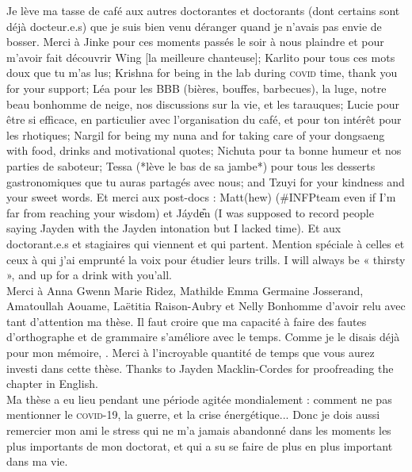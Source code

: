 Je lève ma tasse de café aux autres doctorantes et doctorants (dont certains sont déjà docteur.e.s) que je suis bien venu déranger quand je n'avais pas envie de bosser. Merci à Jinke pour ces moments passés le soir à nous plaindre et pour m'avoir fait découvrir Wing [la meilleure chanteuse]; Karlito pour tous ces mots doux que tu m'as lus; Krishna for being in the lab during \textsc{covid} time, thank you for your support; Léa pour les BBB (bières, bouffes, barbecues), la luge, notre beau bonhomme de neige, nos discussions sur la vie, et les tarauques; Lucie pour être si efficace, en particulier avec l'organisation du café, et pour ton intérêt pour les rhotiques; Nargil for being my nuna and for taking care of your dongsaeng with food, drinks and motivational quotes; Nichuta pour ta bonne humeur et nos parties de saboteur; Tessa (*lève le bas de sa jambe*) pour tous les desserts gastronomiques que tu auras partagés avec nous; and Tzuyi for your kindness and your sweet words. Et merci aux post-docs : Matt(hew) (\#INFPteam even if I'm far from reaching your wisdom) et Jáyd{\small e᷈}n (I was supposed to record people saying Jayden with the Jayden intonation but I lacked time). Et aux doctorant.e.s et stagiaires qui viennent et qui partent. Mention spéciale à celles et ceux à qui j'ai emprunté la voix pour étudier leurs trills. I will always be « thirsty », and up for a drink with you'all.\\

Merci à Anna Gwenn Marie Ridez, Mathilde Emma Germaine Josserand, Amatoullah Aouame, Laëtitia Raison-Aubry et Nelly Bonhomme d'avoir relu avec tant d'attention ma thèse. Il faut croire que ma capacité à faire des fautes d’orthographe et de grammaire s'améliore avec le temps. Comme je le disais déjà pour mon mémoire, . Merci à l'incroyable quantité de temps que vous aurez investi dans cette thèse. Thanks to Jayden Macklin-Cordes for proofreading the chapter in English.\\

Ma thèse a eu lieu pendant une période agitée mondialement : comment ne pas mentionner le \textsc{covid}-19, la guerre, et la crise énergétique... Donc je dois aussi remercier mon ami le stress qui ne m'a jamais abandonné dans les moments les plus importants de mon doctorat, et qui a su se faire de plus en plus important dans ma vie.\\

